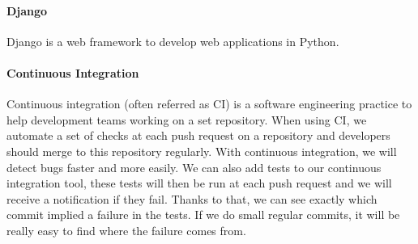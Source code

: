 \paragraph{Django}
Django is a web framework to develop web applications in Python. 

\paragraph{Continuous Integration}
Continuous integration (often referred as CI) is a software engineering practice to help development teams working on a set repository. 
When using CI, we automate a set of checks at each push request on a repository and developers should merge to this repository regularly. With continuous integration, we will detect bugs faster and more easily. We can also add tests to our continuous integration tool, these tests will then be run at each push request and we will receive a notification if they fail. Thanks to that, we can see exactly which commit implied a failure in the tests. If we do small regular commits, it will be really easy to find where the failure comes from.

